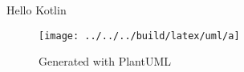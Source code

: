 \documentclass{article}
\begin{document}
    Hello Kotlin\cite{KotlinRelease}
    \begin{figure}
        \centering
        \texttt{[image: ../../../build/latex/uml/a]}
        \caption{Generated with PlantUML}
        \label{fig:gen}
    \end{figure}
\end{document}
